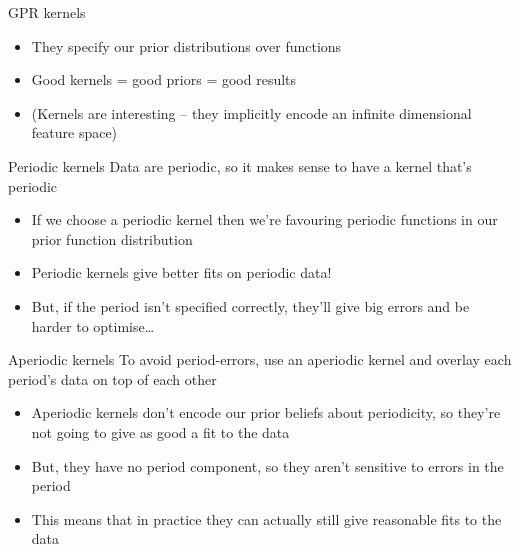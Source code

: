 \documentclass[presentation]{beamer}
\begin{document}
\begin{frame}[label={sec:org66be8b1}]{GPR kernels}
\begin{itemize}
\item They specify our prior distributions over functions
\item Good kernels = good priors = good results
\item (Kernels are interesting -- they implicitly encode an infinite dimensional feature space)
\end{itemize}
\end{frame}

\begin{frame}[label={sec:org837e8cc}]{Periodic kernels}
Data are periodic, so it makes sense to have a kernel that's periodic 

\begin{itemize}
\item If we choose a periodic kernel then we're favouring periodic functions in our prior function distribution
\item Periodic kernels give better fits on periodic data!
\item But, if the period isn't specified correctly, they'll give big errors and be harder to optimise\ldots{}
\end{itemize}
\end{frame}

\begin{frame}[label={sec:org1bdb697}]{Aperiodic kernels}
To avoid period-errors, use an aperiodic kernel and overlay each period's data on top of each other

\begin{itemize}
\item Aperiodic kernels don't encode our prior beliefs about periodicity, so they're not going to give as good a fit to the data
\item But, they have no period component, so they aren't sensitive to errors in the period
\item This means that in practice they can actually still give reasonable fits to the data
\end{itemize}
\end{frame}
\end{document}
